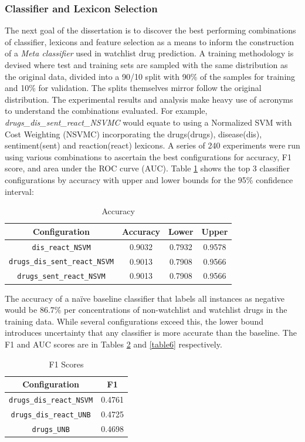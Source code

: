 \documentclass[twoside,11pt]{article}
\begin{document}
\subsubsection{Classifier and Lexicon Selection}
The next goal of the dissertation is to discover the best performing combinations of classifier, lexicons and feature selection as a means to inform the construction of a \textit{Meta classifier} used in watchlist drug prediction. A training methodology is devised where test and training sets are sampled with the same distribution as the original data, divided into a 90/10 split with 90\% of the samples for training and 10\% for validation. The splits themselves mirror follow the original distribution.
The experimental results and analysis make heavy use of acronyms to understand the combinations evaluated. For example, \textit{drugs\_dis\_sent\_react\_NSVMC} would equate to using a Normalized SVM with Cost Weighting (NSVMC) incorporating the drugs(drugs), disease(dis), sentiment(sent) and reaction(react) lexicons. A series of 240 experiments were run using various combinations to ascertain the best configurations for accuracy, F1 score, and area under the ROC curve (AUC). Table \ref{table4} shows the top 3 classifier configurations by accuracy with upper and lower bounds for the 95\% confidence interval:
\begin{table}[H]
  \centering
  \caption{Accuracy}
  \label{table4}
  \begin{tabular}{||c|c|c|c||}
    \hline
    Configuration & Accuracy & Lower & Upper \\
    \hline\hline
    \verb|dis_react_NSVM| & 0.9032 & 0.7932 & 0.9578 \\
    \hline
    \verb|drugs_dis_sent_react_NSVM| & 0.9013 & 0.7908 & 0.9566 \\
    \hline
    \verb|drugs_sent_react_NSVM| & 0.9013 & 0.7908 & 0.9566 \\
    \hline
  \end{tabular}
\end{table}
The accuracy of a na\"ive baseline classifier that labels all instances as negative would be 86.7\% per concentrations of non-watchlist and watchlist drugs in the training data. While several configurations exceed this, the lower bound introduces uncertainty that any classifier is more accurate than the baseline. The F1 and AUC scores are in Tables \ref{table5} and \ref{table6} respectively.\\
\begin{minipage}{.6\textwidth}
  \begin{table}[H]
    \caption{F1 Scores}
    \label{table5}
    \begin{tabular}{||c|c||}
      \hline
      Configuration & F1 \\
      \hline\hline
      \verb|drugs_dis_react_NSVM| & 0.4761 \\
      \hline
      \verb|drugs_dis_react_UNB| & 0.4725 \\
      \hline
      \verb|drugs_UNB| & 0.4698 \\
      \hline
    \end{tabular}
  \end{table}
\end{minipage}
\end{document}
